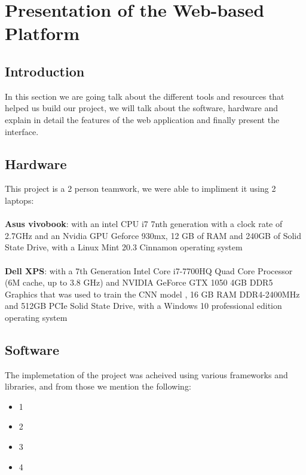 \section{Presentation of the Web-based Platform}



\subsection{Introduction}
    In this section we are going talk about the different tools and resources that helped us build our project, we will talk about the software, hardware and explain in detail the features of the web application and finally present the interface.


\subsection{Hardware}
    This project is a 2 person teamwork, we were able to impliment it using 2 laptops: \\
    \bigskip \\
    \textbf{Asus vivobook}: with an intel CPU i7 7nth generation with a clock rate of 2.7GHz and an Nvidia GPU Geforce 930mx, 12 GB of RAM and 240GB of Solid State Drive, with a Linux Mint 20.3 Cinnamon operating system\\ 
    \bigskip \\
    \textbf{Dell XPS}: with a 7th Generation Intel Core i7-7700HQ Quad Core Processor (6M cache, up to 3.8 GHz) and NVIDIA GeForce GTX 1050 4GB DDR5 Graphics that was used to train the CNN model , 16 GB RAM DDR4-2400MHz and 512GB PCIe Solid State Drive, with a Windows 10 professional edition operating system \\ 


\subsection{Software}
    The implemetation of the project was acheived using various frameworks and libraries, and from those we mention the following: \\
    \begin{itemize}
        \item 1
        \item 2
        \item 3
        \item 4
    \end{itemize}

